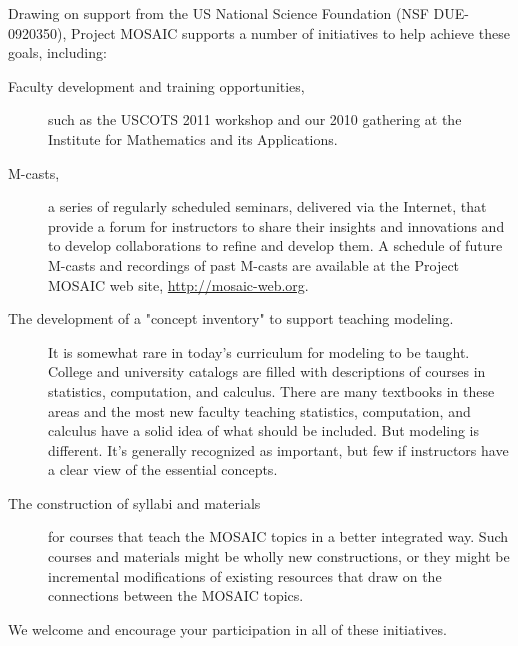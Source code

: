 Drawing on support from the US National Science Foundation (NSF DUE-0920350),
Project MOSAIC supports a number of initiatives to help achieve these goals,
including:
\begin{description}
\item
[Faculty development and training opportunities,] 
such as the USCOTS 2011 workshop and our 2010 gathering at the Institute for Mathematics
and its Applications.

\item
[M-casts,] 
a series of regularly scheduled seminars, delivered via the Internet, 
that provide a forum for instructors to share their insights and innovations 
and to develop collaborations to refine and develop them.
A schedule of future M-casts and recordings of past M-casts are available
at the Project MOSAIC web site, \url{http://mosaic-web.org}.

\item[The development of a "concept inventory" to support teaching modeling.] 
It is somewhat rare in today's curriculum for modeling to be taught. 
College and university catalogs are filled with descriptions of courses 
in statistics, computation, and calculus. There are many textbooks in 
these areas and the most new faculty teaching statistics, computation, 
and calculus have a solid idea of what should be included. 
But modeling is different. It's generally recognized
as important, but few if instructors have a clear view of the essential
concepts.

\item[The construction of syllabi and materials] 
for courses that teach the MOSAIC topics in a better integrated way. Such
courses and materials might be wholly new constructions, or they might be 
incremental modifications of existing resources that draw on the 
connections between the MOSAIC topics.
\end{description}

We welcome and encourage your participation in all of these initiatives.

